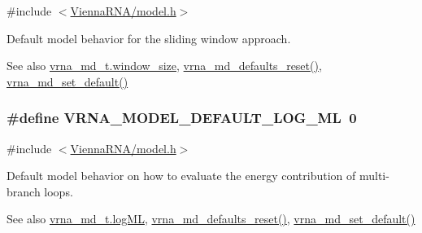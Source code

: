 {\ttfamily \#include $<$\hyperlink{model_8h}{Vienna\+R\+N\+A/model.\+h}$>$}



Default model behavior for the sliding window approach. 

\begin{DoxySeeAlso}{See also}
\hyperlink{structvrna__md__s_abea42f9229f8d8d6bcbedef316315bfc}{vrna\+\_\+md\+\_\+t.\+window\+\_\+size}, \hyperlink{group__model__details_ga70834424cf804d149937de89f80ceb45}{vrna\+\_\+md\+\_\+defaults\+\_\+reset()}, \hyperlink{group__model__details_ga8ac6ff84936282436f822644bf841f66}{vrna\+\_\+md\+\_\+set\+\_\+default()} 
\end{DoxySeeAlso}
\subsubsection[{\texorpdfstring{V\+R\+N\+A\+\_\+\+M\+O\+D\+E\+L\+\_\+\+D\+E\+F\+A\+U\+L\+T\+\_\+\+L\+O\+G\+\_\+\+ML}{VRNA_MODEL_DEFAULT_LOG_ML}}]{\setlength{\rightskip}{0pt plus 5cm}\#define V\+R\+N\+A\+\_\+\+M\+O\+D\+E\+L\+\_\+\+D\+E\+F\+A\+U\+L\+T\+\_\+\+L\+O\+G\+\_\+\+ML~0}\hypertarget{group__model__details_ga938f68463e84fe060aa6502f428a517d}{}\label{group__model__details_ga938f68463e84fe060aa6502f428a517d}


{\ttfamily \#include $<$\hyperlink{model_8h}{Vienna\+R\+N\+A/model.\+h}$>$}



Default model behavior on how to evaluate the energy contribution of multi-\/branch loops. 

\begin{DoxySeeAlso}{See also}
\hyperlink{structvrna__md__s_ae259f89a94acae0c7f1412603e7f57b5}{vrna\+\_\+md\+\_\+t.\+log\+ML}, \hyperlink{group__model__details_ga70834424cf804d149937de89f80ceb45}{vrna\+\_\+md\+\_\+defaults\+\_\+reset()}, \hyperlink{group__model__details_ga8ac6ff84936282436f822644bf841f66}{vrna\+\_\+md\+\_\+set\+\_\+default()} 
\end{DoxySeeAlso}
